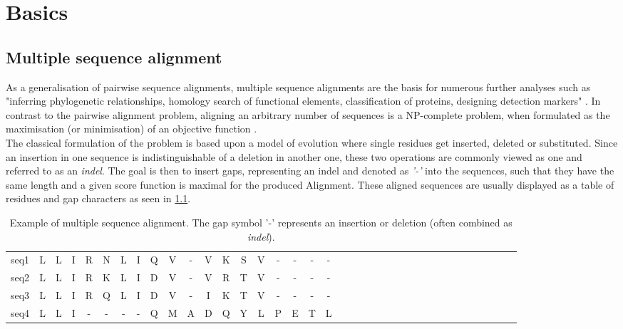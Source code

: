 \chapter{Basics}

\section{Multiple sequence alignment}



As a generalisation of pairwise sequence alignments, multiple sequence alignments are the basis for numerous further analyses such as "inferring phylogenetic relationships, homology search of functional elements, classification of proteins, designing detection markers" \cite[pg. 3]{Russell2016}. In contrast to the pairwise alignment problem, aligning an arbitrary number of sequences is a NP-complete problem, when formulated as the maximisation (or minimisation) of an objective function \cite[pg. 172]{Russell2016}.\\
The classical formulation of the problem is based upon a model of evolution where single residues get inserted, deleted or substituted. Since an insertion in one sequence is indistinguishable of a deletion in another one, these two operations are commonly viewed as one and referred to as an \textit{indel}. The goal is then to insert gaps, representing an indel and denoted as \textit{'-'} into the sequences, such that they have the same length and a given score function is maximal for the produced Alignment. These aligned sequences are usually displayed as a table of residues and gap characters as seen in \cref{tab:msa-example}\cite{Russell2016}. 

\begin{table}[h]
\centering
\begin{tabular}{l c c c c c c c c c c c c c c c c c c c c c c c c c c c c c c c c c c c c}
	seq1 & L&L&I&R&N&L&I&Q&V&-&V&K&S&V&-&-&-&- \\
	seq2 & L&L&I&R&K&L&I&D&V&-&V&R&T&V&-&-&-&- \\
	seq3 & L&L&I&R&Q&L&I&D&V&-&I&K&T&V&-&-&-&- \\
	seq4 & L&L&I&-&-&-&-&Q&M&A&D&Q&Y&L&P&E&T&L \\
\end{tabular}
\caption{Example of multiple sequence alignment. The gap symbol '-' represents an insertion or deletion (often combined as \textit{indel}).}
\label{tab:msa-example}
\end{table}


